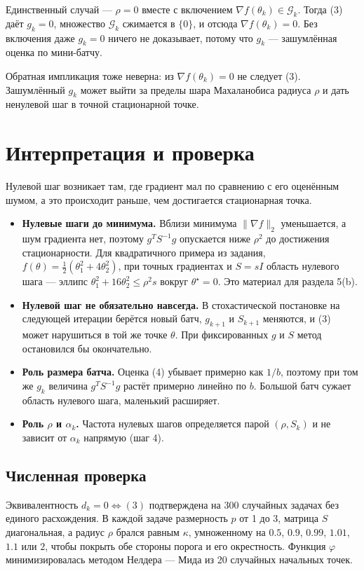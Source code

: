 \documentclass[11pt,a4paper]{article}
\newcommand{\G}{\mathcal{G}_k}
\newcommand{\norm}[1]{\lVert #1\rVert_2}
\begin{document}
Единственный случай — $\rho = 0$ вместе с включением $\nabla f(\theta_k) \in \G$.
Тогда (3) даёт $g_k = 0$, множество $\G$ сжимается в $\{0\}$, и отсюда
$\nabla f(\theta_k) = 0$. Без включения даже $g_k = 0$ ничего не доказывает, потому
что $g_k$ — зашумлённая оценка по мини-батчу.

Обратная импликация тоже неверна: из $\nabla f(\theta_k) = 0$ не следует (3).
Зашумлённый $g_k$ может выйти за пределы шара Махаланобиса радиуса $\rho$ и дать
ненулевой шаг в точной стационарной точке.

\section*{Интерпретация и проверка}

Нулевой шаг возникает там, где градиент мал по сравнению с его оценённым шумом, а
это происходит раньше, чем достигается стационарная точка.

\begin{itemize}
\item \textbf{Нулевые шаги до минимума.} Вблизи минимума $\norm{\nabla f}$
уменьшается, а шум градиента нет, поэтому $g^TS^{-1}g$ опускается ниже $\rho^2$ до
достижения стационарности. Для квадратичного примера из задания,
$f(\theta) = \tfrac12(\theta_1^2 + 4\theta_2^2)$, при точных градиентах и $S = sI$
область нулевого шага — эллипс $\theta_1^2 + 16\theta_2^2 \le \rho^2 s$ вокруг
$\theta^\star = 0$. Это материал для раздела 5(b).
\item \textbf{Нулевой шаг не обязательно навсегда.} В стохастической постановке на
следующей итерации берётся новый батч, $g_{k+1}$ и $S_{k+1}$ меняются, и (3) может
нарушиться в той же точке $\theta$. При фиксированных $g$ и $S$ метод остановился
бы окончательно.
\item \textbf{Роль размера батча.} Оценка (4) убывает примерно как $1/b$, поэтому
при том же $g_k$ величина $g^TS^{-1}g$ растёт примерно линейно по $b$. Большой батч
сужает область нулевого шага, маленький расширяет.
\item \textbf{Роль $\rho$ и $\alpha_k$.} Частота нулевых шагов определяется парой
$(\rho, S_k)$ и не зависит от $\alpha_k$ напрямую (шаг 4).
\end{itemize}

\subsection*{Численная проверка}

Эквивалентность $d_k = 0 \iff (3)$ подтверждена на 300 случайных задачах без
единого расхождения. В каждой задаче размерность $p$ от 1 до 3, матрица $S$
диагональная, а радиус $\rho$ брался равным $\kappa$, умноженному на $0.5$, $0.9$,
$0.99$, $1.01$, $1.1$ или $2$, чтобы покрыть обе стороны порога и его окрестность.
Функция $\varphi$ минимизировалась методом Нелдера — Мида из 20 случайных
начальных точек.
\end{document}
